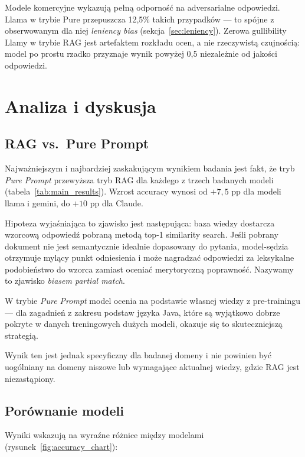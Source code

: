 \documentclass[12pt, a4paper]{article}
\begin{document}
Modele komercyjne wykazują pełną odporność na adversarialne odpowiedzi.
Llama w trybie Pure przepuszcza 12,5\% takich przypadków — to spójne
z obserwowanym dla niej \textit{leniency bias} (sekcja~\ref{sec:leniency}).
Zerowa gullibility Llamy w trybie RAG jest artefaktem rozkładu ocen,
a nie rzeczywistą czujnością: model po prostu rzadko przyznaje wynik
powyżej 0{,}5 niezależnie od jakości odpowiedzi.

\section{Analiza i dyskusja}

\subsection{RAG vs.\ Pure Prompt}

Najważniejszym i najbardziej zaskakującym wynikiem badania jest fakt, że tryb
\textit{Pure Prompt} przewyższa tryb RAG dla każdego z trzech badanych modeli
(tabela~\ref{tab:main_results}).
Wzrost accuracy wynosi od $+7{,}5$ pp dla modeli llama i gemini, do $+10$ pp dla Claude.

Hipoteza wyjaśniająca to zjawisko jest następująca: baza wiedzy dostarcza wzorcową
odpowiedź pobraną metodą top-1 similarity search. Jeśli pobrany dokument nie jest
semantycznie idealnie dopasowany do pytania, model-sędzia otrzymuje mylący punkt
odniesienia i może nagradzać odpowiedzi za leksykalne podobieństwo do wzorca zamiast
oceniać merytoryczną poprawność. Nazywamy to zjawisko \textit{biasem partial match}.

W trybie \textit{Pure Prompt} model ocenia na podstawie własnej wiedzy z pre-trainingu
— dla zagadnień z zakresu podstaw języka Java, które są wyjątkowo dobrze pokryte
w danych treningowych dużych modeli, okazuje się to skuteczniejszą strategią.

Wynik ten jest jednak specyficzny dla badanej domeny i nie powinien być uogólniany
na domeny niszowe lub wymagające aktualnej wiedzy, gdzie RAG jest niezastąpiony.

\subsection{Porównanie modeli}

Wyniki wskazują na wyraźne różnice między modelami (rysunek~\ref{fig:accuracy_chart}):
\end{document}
